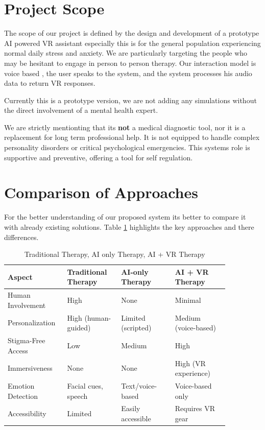 \section{Project Scope}

The scope of our project is defined by the design and development of a prototype AI powered VR assistant especially this is for the general population experiencing normal daily stress and anxiety. We are particularly targeting the people who may be hesitant to engage in person to person therapy. Our interaction model is voice based , the user speaks to the system, and the system processes his audio data to return VR responses.

Currently this is a prototype version, we are not adding any simulations without the direct involvement of a mental health expert.

We are strictly mentionting that its \textbf{not} a medical diagnostic tool, nor it is a replacement for long term professional help. It is not equipped to handle complex personality disorders or critical psychological emergencies. This systems role is supportive and preventive, offering a tool for self regulation.


\section{Comparison of Approaches}

For the better understanding of our proposed system its better to compare it with already existing solutions. Table \ref{tab:comparison} highlights the key approaches and there differences.

\begin{table}[H]
\centering
\small
\renewcommand{\arraystretch}{1.3}
\caption{Traditional Therapy, AI only Therapy, AI + VR Therapy}
\label{tab:comparison}
\begin{tabular}{@{} p{0.2\linewidth} p{0.22\linewidth} p{0.22\linewidth} p{0.22\linewidth} @{}}
\toprule
\rowcolor{gray!20} \textbf{Aspect} & \textbf{Traditional Therapy} & \textbf{AI-only Therapy} & \textbf{AI + VR Therapy} \\
\midrule
Human Involvement & High & None & Minimal \\
Personalization & High (human-guided) & Limited (scripted) & Medium (voice-based) \\
Stigma-Free Access & Low & Medium & High \\
Immersiveness & None & None & High (VR experience) \\
Emotion Detection & Facial cues, speech & Text/voice-based & Voice-based only \\
Accessibility & Limited & Easily accessible & Requires VR gear \\
\bottomrule
\end{tabular}
\end{table}


